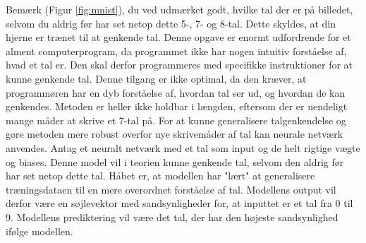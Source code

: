 \documentclass{article}
\newcommand{\figureref}[1]{(Figur \ref{#1})}
\begin{document}
Bemærk \figureref{fig:mnist}, du ved udmærket godt, hvilke tal der er på billedet, selvom du aldrig før har set netop dette 5-, 7- og 8-tal. Dette skyldes, at din hjerne er trænet til at genkende tal. Denne opgave er enormt udfordrende for et alment computerprogram, da programmet ikke har nogen intuitiv forståelse af, hvad et tal er. Den skal derfor programmeres med specifikke instruktioner for at kunne genkende tal. Denne tilgang er ikke optimal, da den kræver, at programmøren har en dyb forståelse af, hvordan tal ser ud, og hvordan de kan genkendes. Metoden er heller ikke holdbar i længden, eftersom der er uendeligt mange måder at skrive et 7-tal på. For at kunne generalisere talgenkendelse og gøre metoden mere robust overfor nye skrivemåder af tal kan neurale netværk anvendes. Antag et neuralt netværk med et tal som input og de helt rigtige vægte og biases. Denne model vil i teorien kunne genkende tal, selvom den aldrig før har set netop dette tal. Håbet er, at modellen har "lært" at generalisere træningsdataen til en mere overordnet forståelse af tal. Modellens output vil derfor være en søjlevektor med sandsynligheder for, at inputtet er et tal fra 0 til 9. Modellens prediktering vil være det tal, der har den højeste sandsynlighed ifølge modellen. \parencite{sanderson2017neural}
\clearpage
\end{document}
